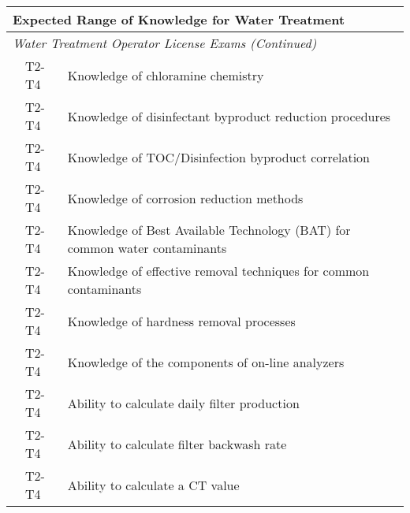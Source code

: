 \begin{table}[H]
\begin{tabular}{| m{1cm} | m{1cm} | m{12cm} |}
\hline
\multicolumn{3}{|l|}{\textbf{Expected   Range of Knowledge for Water Treatment}}                                                                         \\ \hline
\multicolumn{3}{|l|}{\textit{Water   Treatment Operator License Exams (Continued)}}                                                                        \\ \hline
\multicolumn{1}{l|}{} & \multicolumn{1}{l|}{T2-T4} & Knowledge of   chloramine chemistry                                                        \\ \cline{2-3} 
\multicolumn{1}{l|}{} & \multicolumn{1}{l|}{T2-T4} & Knowledge of   disinfectant byproduct reduction procedures                                 \\ \cline{2-3} 
\multicolumn{1}{l|}{} & \multicolumn{1}{l|}{T2-T4} & Knowledge of   TOC/Disinfection byproduct correlation                                      \\ \cline{2-3} 
\multicolumn{1}{l|}{} & \multicolumn{1}{l|}{T2-T4} & Knowledge of   corrosion reduction methods                                                 \\ \cline{2-3} 
\multicolumn{1}{l|}{} & \multicolumn{1}{l|}{T2-T4} & Knowledge of Best   Available Technology (BAT) for common water contaminants               \\ \cline{2-3} 
\multicolumn{1}{l|}{} & \multicolumn{1}{l|}{T2-T4} & Knowledge of   effective removal techniques for common contaminants                        \\ \cline{2-3} 
\multicolumn{1}{l|}{} & \multicolumn{1}{l|}{T2-T4} & Knowledge of hardness   removal processes                                                  \\ \cline{2-3} 
\multicolumn{1}{l|}{} & \multicolumn{1}{l|}{T2-T4} & Knowledge of the   components of on-line analyzers                                         \\ \cline{2-3} 
\multicolumn{1}{l|}{} & \multicolumn{1}{l|}{T2-T4} & Ability to calculate   daily filter production                                             \\ \cline{2-3} 
\multicolumn{1}{l|}{} & \multicolumn{1}{l|}{T2-T4} & Ability to calculate   filter backwash rate                                                \\ \cline{2-3} 
\multicolumn{1}{l|}{} & \multicolumn{1}{l|}{T2-T4} & Ability to calculate   a CT value                                                          \\ \cline{2-3} 

\end{tabular}
\end{table}
